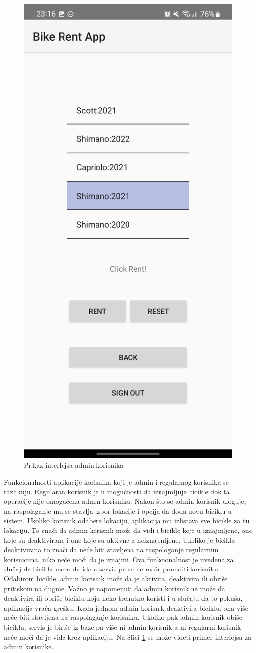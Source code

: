 \documentclass[12pt,oneside]{memoir}
\begin{document}
\begin{figure}[!ht]
  \centering
  \includegraphics[height=0.6\textwidth]{AdminKorisnikInterfejs.jpg}
  \caption{Prikaz interfejsa admin korisnika}
  \label{fig:adminKorisnikInterfejs}
\end{figure}

 
Funkcionalnosti aplikacije korisnika koji je admin i regularnog korisnika se razlikuju. Regularan korisnik je u mogućnosti da iznajmljuje bicikle dok ta operacije nije omogućena admin korisniku. Nakon što se admin korisnik uloguje, na raspolaganje mu se stavlja izbor lokacije i opcija da doda novu biciklu u sistem. Ukoliko korisnik odabere lokaciju, aplikacija mu izlistava sve bicikle za tu lokaciju. To znači da admin korisnik može da vidi i bicikle koje u iznajmljene, one koje su deaktivirane i one koje su aktivne a neiznajmljene. Ukoliko je bicikla deaktivirana to znači da neće biti stavljena na raspologanje regularnim korisnicima, niko neće moći da je iznajmi. Ova funkcionalnost je uvedena za slučaj da bicikla mora da ide u servis pa se ne može ponuditi korisniku. Odabirom bicikle, admin korisnik može da je aktivira, deaktivira ili obriše pritiskom na dugme. Važno je napomenuti da admin korisnik ne može da deaktivira ili obriše biciklu koju neko trenutno koristi i u slučaju da to pokuša, aplikacija vraća grešku. Kada jednom admin korisnik deaktivira biciklu, ona više neće biti stavljena na raspolaganje korisniku. Ukoliko pak admin korisnik obiše biciklu, servis je biriše iz baze pa više ni admin korisnik a ni regularni korisnik neće moći da je vide kroz aplikaciju. Na Slici \ref{fig:adminKorisnikInterfejs} se može videti primer interfejsa za admin korisnike.
\end{document}
